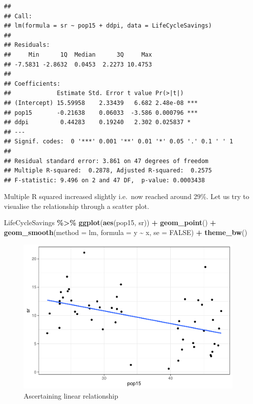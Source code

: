\documentclass[
]{book}
\newenvironment{Shaded}{\begin{snugshade}}{\end{snugshade}}
\newcommand{\AttributeTok}[1]{\textcolor[rgb]{0.13,0.29,0.53}{#1}}
\newcommand{\ConstantTok}[1]{\textcolor[rgb]{0.56,0.35,0.01}{#1}}
\newcommand{\FunctionTok}[1]{\textcolor[rgb]{0.13,0.29,0.53}{\textbf{#1}}}
\newcommand{\NormalTok}[1]{#1}
\newcommand{\SpecialCharTok}[1]{\textcolor[rgb]{0.81,0.36,0.00}{\textbf{#1}}}
\newcommand{\StringTok}[1]{\textcolor[rgb]{0.31,0.60,0.02}{#1}}
\begin{document}
\begin{verbatim}
## 
## Call:
## lm(formula = sr ~ pop15 + ddpi, data = LifeCycleSavings)
## 
## Residuals:
##     Min      1Q  Median      3Q     Max 
## -7.5831 -2.8632  0.0453  2.2273 10.4753 
## 
## Coefficients:
##             Estimate Std. Error t value Pr(>|t|)    
## (Intercept) 15.59958    2.33439   6.682 2.48e-08 ***
## pop15       -0.21638    0.06033  -3.586 0.000796 ***
## ddpi         0.44283    0.19240   2.302 0.025837 *  
## ---
## Signif. codes:  0 '***' 0.001 '**' 0.01 '*' 0.05 '.' 0.1 ' ' 1
## 
## Residual standard error: 3.861 on 47 degrees of freedom
## Multiple R-squared:  0.2878, Adjusted R-squared:  0.2575 
## F-statistic: 9.496 on 2 and 47 DF,  p-value: 0.0003438
\end{verbatim}

Multiple R squared increased slightly i.e.~now reached around 29\%. Let us try to visualise the relationship through a scatter plot.

\begin{Shaded}
\begin{Highlighting}[]
\NormalTok{LifeCycleSavings }\SpecialCharTok{\%\textgreater{}\%} 
  \FunctionTok{ggplot}\NormalTok{(}\FunctionTok{aes}\NormalTok{(pop15, sr)) }\SpecialCharTok{+}
  \FunctionTok{geom\_point}\NormalTok{() }\SpecialCharTok{+}
  \FunctionTok{geom\_smooth}\NormalTok{(}\AttributeTok{method =} \StringTok{\textquotesingle{}lm\textquotesingle{}}\NormalTok{, }\AttributeTok{formula =} \StringTok{\textquotesingle{}y \textasciitilde{} x\textquotesingle{}}\NormalTok{, }\AttributeTok{se =} \ConstantTok{FALSE}\NormalTok{) }\SpecialCharTok{+}
  \FunctionTok{theme\_bw}\NormalTok{()}
\end{Highlighting}
\end{Shaded}

\begin{figure}

{\centering \includegraphics[height=0.3\textheight]{DauR_files/figure-latex/unnamed-chunk-346-1} 

}

\caption{Ascertaining linear relationship}\label{fig:unnamed-chunk-346}
\end{figure}
\end{document}

